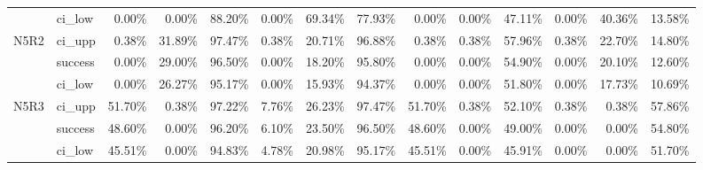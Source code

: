 \begin{tabular}{llrrrrrrrrrrrr}
     & ci\_low &       0.00\% &  0.00\% & 88.20\% &  0.00\% & 69.34\% & 77.93\% &        0.00\% &  0.00\% & 47.11\% &  0.00\% & 40.36\% & 13.58\% \\
N5R2 & ci\_upp &       0.38\% & 31.89\% & 97.47\% &  0.38\% & 20.71\% & 96.88\% &        0.38\% &  0.38\% & 57.96\% &  0.38\% & 22.70\% & 14.80\% \\
     & success &       0.00\% & 29.00\% & 96.50\% &  0.00\% & 18.20\% & 95.80\% &        0.00\% &  0.00\% & 54.90\% &  0.00\% & 20.10\% & 12.60\% \\
     & ci\_low &       0.00\% & 26.27\% & 95.17\% &  0.00\% & 15.93\% & 94.37\% &        0.00\% &  0.00\% & 51.80\% &  0.00\% & 17.73\% & 10.69\% \\
N5R3 & ci\_upp &      51.70\% &  0.38\% & 97.22\% &  7.76\% & 26.23\% & 97.47\% &       51.70\% &  0.38\% & 52.10\% &  0.38\% &  0.38\% & 57.86\% \\
     & success &      48.60\% &  0.00\% & 96.20\% &  6.10\% & 23.50\% & 96.50\% &       48.60\% &  0.00\% & 49.00\% &  0.00\% &  0.00\% & 54.80\% \\
     & ci\_low &      45.51\% &  0.00\% & 94.83\% &  4.78\% & 20.98\% & 95.17\% &       45.51\% &  0.00\% & 45.91\% &  0.00\% &  0.00\% & 51.70\% \\
\bottomrule
\end{tabular}

